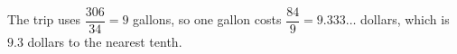 The trip uses $\dfrac{306}{34}=9$ gallons, so one gallon costs $\dfrac{84}{9}=9.333\ldots$ dollars, which is $\boxed{9.3}$ dollars to the nearest tenth.
